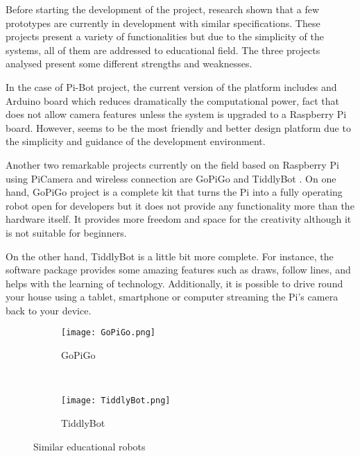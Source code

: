 Before starting the development of the project, research shown that a few prototypes are currently in development with similar specifications. These projects present a variety of functionalities but due to the simplicity of the systems, all of them are addressed to educational field. The three projects analysed present some different strengths and weaknesses. 

In the case of Pi-Bot \cite{PiBot} project, the current version of the platform includes and Arduino board which reduces dramatically the computational power, fact that does not allow camera features unless the system is upgraded to a Raspberry Pi board. However, seems to be the most friendly and better design platform due to the simplicity and guidance of the development environment.

Another two remarkable projects currently on the field based on Raspberry Pi using PiCamera and wireless connection are GoPiGo \cite{GoPiGo} and TiddlyBot \cite{TiddlyBot}. On one hand, GoPiGo project is a complete kit that turns the Pi into a fully operating robot open for developers but it does not provide any functionality more than the hardware itself. It provides more freedom and space for the creativity although it is not suitable for beginners.

On the other hand, TiddlyBot is a little bit more complete. For instance, the software package provides some amazing features such as draws, follow lines, and helps with the learning of technology. Additionally, it is possible to drive round your house using a tablet, smartphone or computer streaming the Pi's camera back to your device.

\begin{figure}
     \centering
     \begin{subfigure}[b]{0.3\textwidth}
             \texttt{[image: GoPiGo.png]}
             \caption{GoPiGo}
             \label{fig:GoPiGo}
     \end{subfigure}%
     ~
     \begin{subfigure}[b]{0.3\textwidth}
             \texttt{[image: TiddlyBot.png]}
             \caption{TiddlyBot}
             \label{fig:TiddlyBot}
     \end{subfigure}
     \caption{Similar educational robots}\label{fig:robots}
\end{figure}